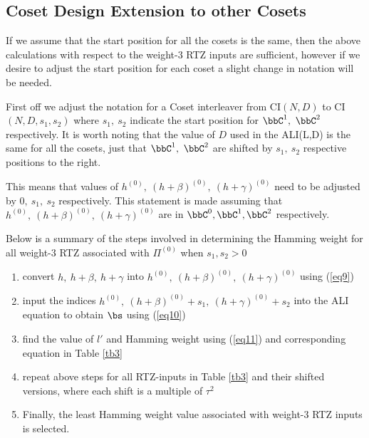  \subsection{Coset Design Extension to other Cosets}
 If we assume that the start position for all the cosets is the same, then the above calculations with respect to the weight-$3$ RTZ inputs are sufficient, however if we desire to adjust the start position for each coset a slight change in notation will be needed. 
 
 First off we adjust the notation for a Coset interleaver from CI$(N,D)$ to CI$(N,D,s_1,s_2)$ where $s_1,~s_2$ indicate the start position for $\bbC^1,~\bbC^2$ respectively. It is worth noting that the value of $D$ used in the ALI(L,D) is the same for all the cosets, just that $\bbC^1,~\bbC^2$ are shifted by  $s_1,~s_2$ respective positions to the right.
 
 This means that values of $h^{(0)},~(h+\beta)^{(0)},~(h+\gamma)^{(0)}$ need to be adjusted by $0,~s_1,~s_2$ respectively. This statement is made assuming that $h^{(0)},~(h+\beta)^{(0)},~(h+\gamma)^{(0)}$ are in $\bbC^0,\bbC^1,\bbC^2$ respectively.
 
  Below is a summary of the steps involved in determining the Hamming weight for all weight-$3$ RTZ associated with $\Pi^{(0)}$ when $s_1,s_2>0$
 \begin{enumerate}
 \item convert  $h,~h+\beta,~h+\gamma$ into $h^{(0)},~(h+\beta)^{(0)},~(h+\gamma)^{(0)}$ using (\ref{eq9})
 
 \item input the indices $h^{(0)},~(h+\beta)^{(0)}+s_1,~(h+\gamma)^{(0)}+s_2$
 into the ALI equation to obtain $\bs$ using (\ref{eq10})
 
 \item find the value of $l'$ and  Hamming weight using (\ref{eq11}) and corresponding equation in Table \ref{tb3}
 
 \item repeat above steps for all RTZ-inputs in Table \ref{tb3} and their shifted versions, where each shift is a multiple of $\tau^2$
 
\item Finally, the least Hamming weight value associated with weight-$3$ RTZ inputs is selected.
 \end{enumerate}
 
